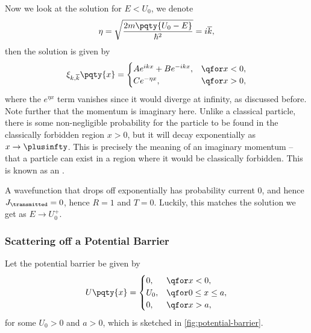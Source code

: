 Now we look at the solution for \(E < U_0\), we denote
\begin{equation}
    \eta = \sqrt{\frac{2m \pqty{U_0 - E}}{\hbar^2}} = i \overline{k},
\end{equation}
then the solution is given by
\begin{equation}
    \xi_{k, \overline{k}} \pqty{x} = \begin{cases}
        A e^{i k x} + B e^{- i k x}, & \qfor x < 0, \\
        C e^{- \eta x}, & \qfor x > 0,
    \end{cases}
\end{equation}
where the \(e^{\eta x}\) term vanishes since it would diverge at infinity, as discussed before. Note further that the momentum is imaginary here. Unlike a classical particle, there is some non-negligible probability for the particle to be found in the classically forbidden region \(x > 0\), but it will decay exponentially as \(x \to \plusinfty\). This is precisely the meaning of an imaginary momentum -- that a particle can exist in a region where it would be classically forbidden. This is known as an .

A wavefunction that drops off exponentially has probability current \(0\), and hence \(J_{\transmitted} = 0\), hence \(R = 1\) and \(T = 0\). Luckily, this matches the solution we get as \(E \to U_0^+\).

\subsubsection{Scattering off a Potential Barrier}

Let the potential barrier be given by
\begin{equation}
    U\pqty{x} = \begin{cases}
        0, & \qfor x < 0, \\
        U_0, & \qfor 0 \leq x \leq a, \\
        0, & \qfor x > a,
    \end{cases}
\end{equation}
for some \(U_0 > 0\) and \(a > 0\), which is sketched in \autoref{fig:potential-barrier}.

